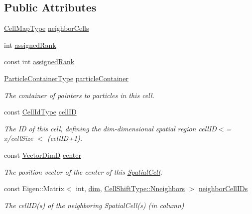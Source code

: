 \subsection*{Public Attributes}
\begin{DoxyCompactItemize}
\item 
\hyperlink{structmodel_1_1_spatial_cell_a4c03425d6c8328b5587c9b385d1b9a26}{Cell\+Map\+Type} \hyperlink{structmodel_1_1_spatial_cell_ab164893960e35ae32ae48cb036543206}{neighbor\+Cells}
\item 
int \hyperlink{structmodel_1_1_spatial_cell_abe01750afbf487494f73c94ff8666839}{assigned\+Rank}
\item 
const int \hyperlink{structmodel_1_1_spatial_cell_a7b3b971825b8ba18411422d3d31d9230}{assigned\+Rank}
\item 
\hyperlink{structmodel_1_1_spatial_cell_af69747431f1a63b915132ca461175826}{Particle\+Container\+Type} \hyperlink{structmodel_1_1_spatial_cell_a3caa85674c51c29e30b00bb8f7aa753c}{particle\+Container}
\begin{DoxyCompactList}\small\item\em The container of pointers to particles in this cell. \end{DoxyCompactList}\item 
const \hyperlink{structmodel_1_1_spatial_cell_acc48b0ece2bb5487d1ea96903dbbe626}{Cell\+Id\+Type} \hyperlink{structmodel_1_1_spatial_cell_af197620ccfcaf52638bde5b5d60a1994}{cell\+I\+D}
\begin{DoxyCompactList}\small\item\em The I\+D of this cell, defining the dim-\/dimensional spatial region cell\+I\+D$<$= x/cell\+Size $<$ (cell\+I\+D+1). \end{DoxyCompactList}\item 
const \hyperlink{structmodel_1_1_spatial_cell_aeaaeb951297c67dde8b981038936d7b8}{Vector\+Dim\+D} \hyperlink{structmodel_1_1_spatial_cell_a2a28d9ffe57c615c9ff18f21363276a0}{center}
\begin{DoxyCompactList}\small\item\em The position vector of the center of this \hyperlink{structmodel_1_1_spatial_cell}{Spatial\+Cell}. \end{DoxyCompactList}\item 
const Eigen\+::\+Matrix$<$ int, \hyperlink{plot_nd_a_8m_a382f3ca768b275b8d563604f7fc7df73}{dim}, \hyperlink{classmodel_1_1_cell_shift_ab1590de7ef0bb9642434e2950f5771b2aee4134d6cbf2ecb50b24a8d678fed79f}{Cell\+Shift\+Type\+::\+Nneighbors} $>$ \hyperlink{structmodel_1_1_spatial_cell_a80ba891e33f419a9543695ac975db027}{neighbor\+Cell\+I\+Ds}
\begin{DoxyCompactList}\small\item\em The cell\+I\+D(s) of the neighboring Spatial\+Cell(s) (in column) \end{DoxyCompactList}\end{DoxyCompactItemize}


